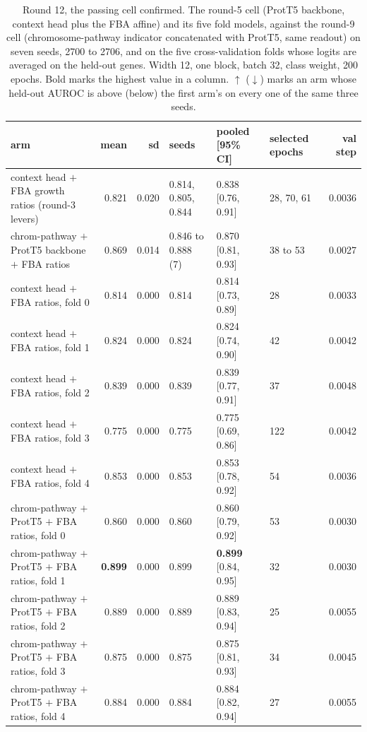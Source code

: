 \begin{table}[H]
  \centering
  \footnotesize
  \caption[Round 12, the passing cell confirmed]{Round 12, the passing cell confirmed. The round-5 cell (ProtT5 backbone, context head plus the FBA affine) and its five fold models, against the round-9 cell (chromosome-pathway indicator concatenated with ProtT5, same readout) on seven seeds, 2700 to 2706, and on the five cross-validation folds whose logits are averaged on the held-out genes. Width 12, one block, batch 32, class weight, 200 epochs. Bold marks the highest value in a column. $\uparrow$ ($\downarrow$) marks an arm whose held-out AUROC is above (below) the first arm's on every one of the same three seeds.}
  \label{tab:w23}
  \begin{tabular}{@{}lrrlllr@{}}
    \hline
    arm & mean & sd & seeds & pooled [95\% CI] & selected epochs & val step \\
    \hline
    context head $+$ FBA growth ratios (round-3 levers) & 0.821 & 0.020 & 0.814, 0.805, 0.844 & 0.838 [0.76, 0.91] & 28, 70, 61 & 0.0036 \\
    chrom-pathway $+$ ProtT5 backbone $+$ FBA ratios & 0.869 & 0.014 & 0.846 to 0.888 (7) & 0.870 [0.81, 0.93] & 38 to 53 & 0.0027 \\
    context head $+$ FBA ratios, fold 0 & 0.814 & 0.000 & 0.814 & 0.814 [0.73, 0.89] & 28 & 0.0033 \\
    context head $+$ FBA ratios, fold 1 & 0.824 & 0.000 & 0.824 & 0.824 [0.74, 0.90] & 42 & 0.0042 \\
    context head $+$ FBA ratios, fold 2 & 0.839 & 0.000 & 0.839 & 0.839 [0.77, 0.91] & 37 & 0.0048 \\
    context head $+$ FBA ratios, fold 3 & 0.775 & 0.000 & 0.775 & 0.775 [0.69, 0.86] & 122 & 0.0042 \\
    context head $+$ FBA ratios, fold 4 & 0.853 & 0.000 & 0.853 & 0.853 [0.78, 0.92] & 54 & 0.0036 \\
    chrom-pathway $+$ ProtT5 $+$ FBA ratios, fold 0 & 0.860 & 0.000 & 0.860 & 0.860 [0.79, 0.92] & 53 & 0.0030 \\
    chrom-pathway $+$ ProtT5 $+$ FBA ratios, fold 1 & \textbf{0.899} & 0.000 & 0.899 & \textbf{0.899} [0.84, 0.95] & 32 & 0.0030 \\
    chrom-pathway $+$ ProtT5 $+$ FBA ratios, fold 2 & 0.889 & 0.000 & 0.889 & 0.889 [0.83, 0.94] & 25 & 0.0055 \\
    chrom-pathway $+$ ProtT5 $+$ FBA ratios, fold 3 & 0.875 & 0.000 & 0.875 & 0.875 [0.81, 0.93] & 34 & 0.0045 \\
    chrom-pathway $+$ ProtT5 $+$ FBA ratios, fold 4 & 0.884 & 0.000 & 0.884 & 0.884 [0.82, 0.94] & 27 & 0.0055 \\
    \hline
  \end{tabular}
\end{table}

